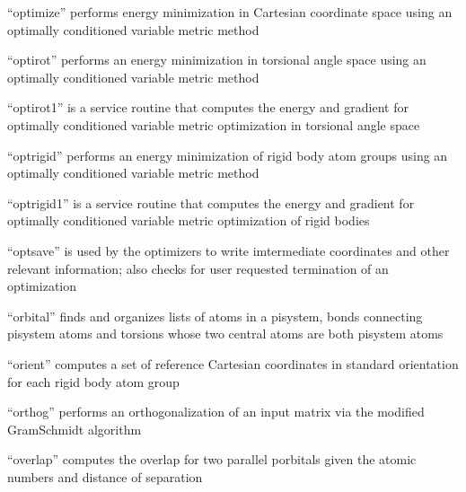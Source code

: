 \documentclass[letterpaper,11pt,english]{sphinxmanual}
\begin{document}

“optimize” performs energy minimization in Cartesian coordinate space using an optimally conditioned variable metric method


“optirot” performs an energy minimization in torsional angle space using an optimally conditioned variable metric method


“optirot1” is a service routine that computes the energy and gradient for optimally conditioned variable metric optimization in torsional angle space


“optrigid” performs an energy minimization of rigid body atom groups using an optimally conditioned variable metric method


“optrigid1” is a service routine that computes the energy and gradient for optimally conditioned variable metric optimization of rigid bodies


“optsave” is used by the optimizers to write imtermediate coordinates and other relevant information; also checks for user requested termination of an optimization


“orbital” finds and organizes lists of atoms in a pisystem, bonds connecting pisystem atoms and torsions whose two central atoms are both pisystem atoms


“orient” computes a set of reference Cartesian coordinates in standard orientation for each rigid body atom group


“orthog” performs an orthogonalization of an input matrix via the modified Gram\sphinxhyphen{}Schmidt algorithm


“overlap” computes the overlap for two parallel p\sphinxhyphen{}orbitals given the atomic numbers and distance of separation

\end{document}
